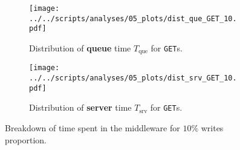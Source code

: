 \documentclass[11pt]{article}
\newcommand\task[1]{{\color[HTML]{999999}\subsection{Task}#1}}
\renewcommand\task[1]{}
\theoremstyle{definition}
\newcommand\Tque{T_{\mathrm{que}}}
\newcommand\Tsrv{T_{\mathrm{srv}}}
\renewcommand\b[1]{{\bf{#1}}}
\renewcommand\t\texttt
\begin{document}
\begin{figure}[!h]
    \begin{subfigure}[t]{\wdt}
        \centering
        \texttt{[image: ../../scripts/analyses/05\_plots/dist\_que\_GET\_10.pdf]}
        \caption{Distribution of \b{queue} time $\Tque$ for \t{GET}s.}\label{fig:05_breakdown-que-get-10}
    \end{subfigure}
    \hspace{0.2cm}
    \begin{subfigure}[t]{\wdt}
        \centering
        \texttt{[image: ../../scripts/analyses/05\_plots/dist\_srv\_GET\_10.pdf]}
        \caption{Distribution of \b{server} time $\Tsrv$ for \t{GET}s.}\label{fig:05_breakdown-srv-get-10}
    \end{subfigure}
    \caption{Breakdown of time spent in the middleware for $10\%$ writes proportion.}
    \label{fig:05_breakdown-10}
\end{figure}

\task{
In this section, you should study the changes in throughput and response time of your system as the percentage of write operations increases. Use a combination of 3 to 7 servers and vary the number of writes between 1\% and 10\% (e.g. 1\%, 5\% and 10\%). The experiments need to be carried out for the replication factors R=1 and R=all.  

For what number of servers do you see the biggest impact (relative to base case) on performance? Investigate the main reason for the reduced performance and provide a detailed explanation of the behavior of the system. Provide the graphs and tables necessary to support your claims.
}
\end{document}
